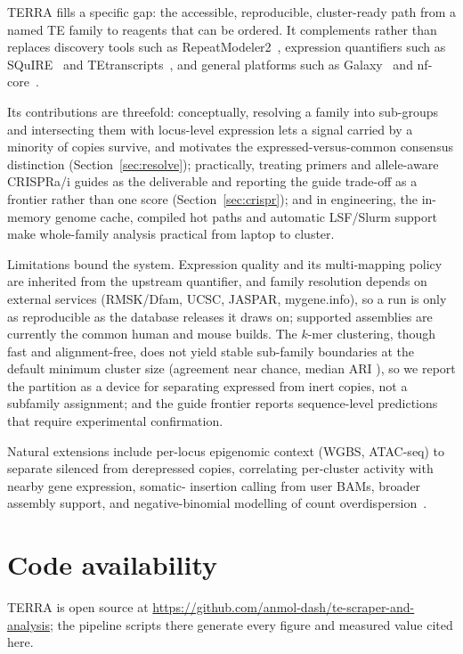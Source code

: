\documentclass[11pt]{article}
\begin{document}
TERRA fills a specific gap: the accessible, reproducible, cluster-ready path from a named TE
family to reagents that can be ordered. It complements rather than replaces discovery tools
such as RepeatModeler2~\citep{flynn2020}, expression quantifiers such as
SQuIRE~\citep{yang2019squire} and TEtranscripts~\citep{jin2015tetranscripts}, and general
platforms such as Galaxy~\citep{galaxy2022} and nf-core~\citep{ewels2020}.

Its contributions are threefold: conceptually, resolving a family into sub-groups and
intersecting them with locus-level expression lets a signal carried by a minority of copies
survive, and motivates the expressed-versus-common consensus distinction
(Section~\ref{sec:resolve}); practically, treating primers and allele-aware CRISPRa/i guides as
the deliverable and reporting the guide trade-off as a frontier rather than one score
(Section~\ref{sec:crispr}); and in engineering, the in-memory genome cache, compiled hot paths
and automatic LSF/Slurm support make whole-family analysis practical from laptop to cluster.

Limitations bound the system. Expression quality and its multi-mapping policy are inherited from
the upstream quantifier, and family resolution depends on external services (RMSK/Dfam, UCSC,
JASPAR, mygene.info), so a run is only as reproducible as the database releases it draws on;
supported assemblies are currently the common human and mouse builds. The $k$-mer clustering,
though fast and alignment-free, does not yield stable sub-family boundaries at the default
minimum cluster size (agreement near chance, median ARI \cvMedianARI{}), so we report the
partition as a device for separating expressed from inert copies, not a subfamily assignment;
and the guide frontier reports sequence-level predictions that require experimental
confirmation.

Natural extensions include per-locus epigenomic context (WGBS, ATAC-seq) to separate silenced
from derepressed copies, correlating per-cluster activity with nearby gene expression, somatic-
insertion calling from user BAMs, broader assembly support, and negative-binomial modelling of
count overdispersion~\citep{love2014deseq2,robinson2010edger}.

\section*{Code availability}
TERRA is open source at \url{https://github.com/anmol-dash/te-scraper-and-analysis}; the
pipeline scripts there generate every figure and measured value cited here.
\end{document}
